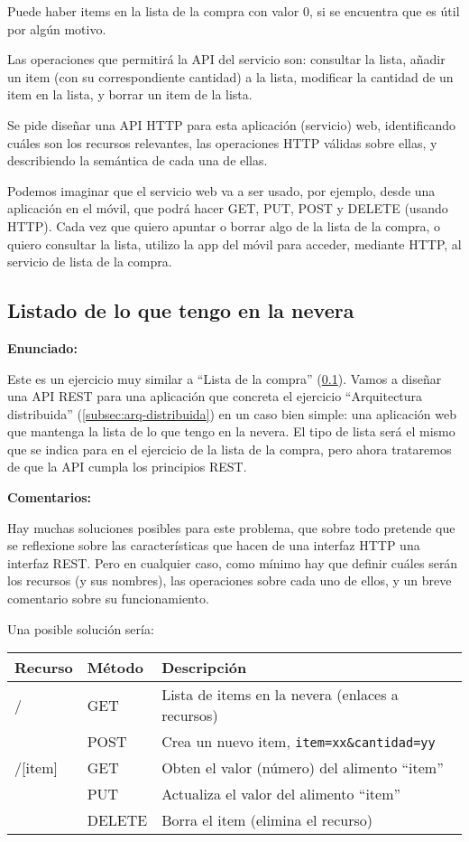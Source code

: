 Puede haber items en la lista de la compra con valor 0, si se encuentra que es útil por algún motivo.

Las operaciones que permitirá la API del servicio son: consultar la lista, añadir un item (con su correspondiente cantidad) a la lista, modificar la cantidad de un item en la lista, y borrar un item de la lista.

Se pide diseñar una API HTTP para esta aplicación (servicio) web, identificando cuáles son los recursos relevantes, las operaciones HTTP válidas sobre ellas, y describiendo la semántica de cada una de ellas.

Podemos imaginar que el servicio web va a ser usado, por ejemplo, desde una aplicación en el móvil, que podrá hacer GET, PUT, POST y DELETE (usando HTTP). Cada vez que quiero apuntar o borrar algo de la lista de la compra, o quiero consultar la lista, utilizo la app del móvil para acceder, mediante HTTP, al servicio de lista de la compra.

\subsection{Listado de lo que tengo en la nevera}
\label{subsec:contenido-nevera}

\textbf{Enunciado:}

Este es un ejercicio muy similar a ``Lista de la compra'' (\ref{subsec:contenido-nevera}). Vamos a diseñar una API REST para una aplicación que concreta el ejercicio ``Arquitectura distribuida'' (\ref{subsec:arq-distribuida}) en un caso bien simple: una aplicación web que mantenga la lista de lo que tengo en la nevera. El tipo de lista será el mismo que se indica para en el ejercicio de la lista de la compra, pero ahora trataremos de que la API cumpla los principios REST.

\textbf{Comentarios:}

Hay muchas soluciones posibles para este problema, que sobre todo pretende que se reflexione sobre las características que hacen de una interfaz HTTP una interfaz REST. Pero en cualquier caso, como mínimo hay que definir cuáles serán los recursos (y sus nombres), las operaciones sobre cada uno de ellos, y un breve comentario sobre su funcionamiento.

Una posible solución sería: \\

\begin{tabular}{l|l|p{10cm}}
  Recurso & Método & Descripción \\ \hline \hline
  /       & GET    & Lista de items en la nevera (enlaces a recursos) \\
          & POST   & Crea un nuevo item, \verb|item=xx&cantidad=yy| \\
  /[item] & GET    & Obten el valor (número) del alimento ``item'' \\
          & PUT    & Actualiza el valor del alimento ``item'' \\
          & DELETE & Borra el item (elimina el recurso) \\
\end{tabular}

